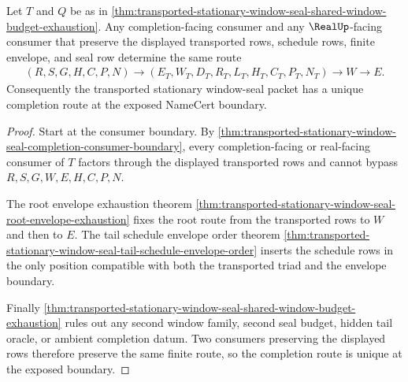 \begin{theorem}
\label{thm:transported-stationary-window-seal-completion-route-uniqueness}
Let $T$ and $Q$ be as in \autoref{thm:transported-stationary-window-seal-shared-window-budget-exhaustion}. Any completion-facing consumer and any $\RealUp$-facing consumer that preserve the displayed transported rows, schedule rows, finite envelope, and seal row determine the same route
$$
\begin{aligned}
  (R,S,G,H,C,P,N)
  \longrightarrow
  (E_T,W_T,D_T,R_T,L_T,H_T,C_T,P_T,N_T)
  \longrightarrow
  W
  \longrightarrow
  E .
\end{aligned}
$$
Consequently the transported stationary window-seal packet has a unique completion route at the exposed NameCert boundary.
\end{theorem}
\begin{proof}
Start at the consumer boundary. By \autoref{thm:transported-stationary-window-seal-completion-consumer-boundary}, every completion-facing or real-facing consumer of $T$ factors through the displayed transported rows and cannot bypass $R,S,G,W,E,H,C,P,N$.

The root envelope exhaustion theorem \autoref{thm:transported-stationary-window-seal-root-envelope-exhaustion} fixes the root route from the transported rows to $W$ and then to $E$. The tail schedule envelope order theorem \autoref{thm:transported-stationary-window-seal-tail-schedule-envelope-order} inserts the schedule rows in the only position compatible with both the transported triad and the envelope boundary.

Finally \autoref{thm:transported-stationary-window-seal-shared-window-budget-exhaustion} rules out any second window family, second seal budget, hidden tail oracle, or ambient completion datum. Two consumers preserving the displayed rows therefore preserve the same finite route, so the completion route is unique at the exposed boundary.
\end{proof}

